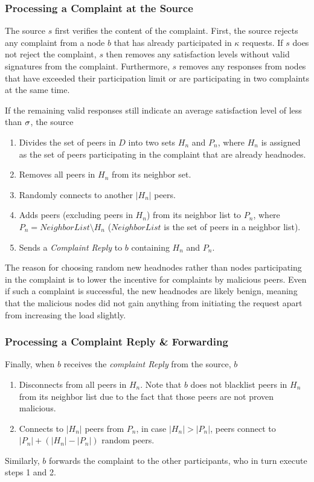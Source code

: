 \subsubsection*{Processing a Complaint at the Source}

The source $s$ first verifies the content of the complaint. First, the source rejects any complaint from a node $b$ that has already participated in $\kappa$ requests. 
If $s$ does not reject the complaint, $s$ then removes any satisfaction levels without valid signatures from the complaint.
Furthermore, $s$ removes any responses from nodes that have exceeded their participation limit or are participating in two complaints at the same time. 

If the remaining valid responses still indicate an average satisfaction level of less than $\sigma$, the source 
\begin{enumerate}
 \item Divides the set of peers in $D$ into two sets $H_n$ and $P_n$, where $H_n$ is assigned as the set of peers participating in the complaint that are already headnodes. 
 \item Removes all peers in $H_n$ from its neighbor set.
 \item Randomly connects to another $|H_n|$ peers. 
 \item Adds peers (excluding peers in $H_n$) from its neighbor list to $P_n$, where $P_n = NeighborList\setminus H_n$ ($NeighborList$ is the set of peers in a neighbor list). 
 \item Sends a \textit{Complaint Reply} to $b$ containing $H_n$ and $P_n$.
\end{enumerate}
 The reason for choosing random new headnodes rather than nodes participating in the complaint is to lower the incentive for complaints by malicious peers. Even if such a complaint is successful, the new headnodes are likely benign, meaning that the malicious nodes did not gain anything from initiating the request apart from increasing the load slightly. 


\subsubsection*{Processing a Complaint Reply \& Forwarding}

Finally, when $b$ receives the \textit{complaint Reply} from the source, $b$ 
\begin{enumerate}
 \item Disconnects from all peers in $H_n$. Note that $b$ does not blacklist peers in $H_n$ from its neighbor list due to the fact that those peers are not proven malicious.
 \item Connects to $|H_n|$ peers from $P_n$, in case $|H_n|>|P_n|$, peers connect to $|P_n|+(|H_n|-|P_n|)$ random peers.
\end{enumerate}
Similarly, $b$ forwards the complaint to the other participants, who in turn execute steps 1 and 2.

